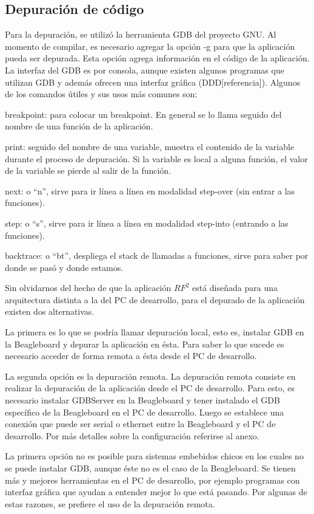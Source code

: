 \subsection{Depuración de código}
Para la depuración, se utilizó la herramienta GDB del proyecto GNU. 
Al momento de compilar, es necesario agregar la opción -g para que la aplicación pueda ser depurada. Esta opción agrega información en el código de la aplicación.
La interfaz del GDB es por consola, aunque existen algunos programas que utilizan GDB y además ofrecen una interfaz gráfica (DDD[referencia]).
Algunos de los comandos útiles y sus usos más comunes son: 

\bigskip
breakpoint: para colocar un breakpoint. En general se lo llama seguido del nombre de una función de la aplicación.

\bigskip
print: seguido del nombre de una variable, muestra el contenido de la variable durante el proceso de depuración. Si la variable es local a alguna función, el valor de la variable se pierde al salir de la función.

\bigskip
next: o “n”, sirve para ir línea a línea en modalidad step-over (sin entrar a las funciones).

\bigskip
step: o “s”, sirve para ir línea a línea en modalidad step-into (entrando a las funciones).

\bigskip
backtrace: o “bt”, despliega el stack de llamadas a funciones, sirve para saber por donde se pasó y donde estamos.

\bigskip
Sin olvidarnos del hecho de que la aplicación $RF^{2}$ está diseñada para una arquitectura distinta a la del PC de desarrollo, para el depurado de la aplicación existen dos alternativas. 

La primera es lo que se podría llamar depuración local, esto es, instalar GDB en la Beagleboard y depurar la aplicación en ésta. Para saber lo que sucede es necesario acceder de forma remota a ésta desde el PC de desarrollo. 

La segunda opción es la depuración remota. La depuración remota consiste en realizar la depuración de la aplicación desde el PC de desarrollo. Para esto, es necesario instalar GDBServer en la Beagleboard y tener instalado el GDB específico de la Beagleboard en el PC de desarrollo. Luego se establece una conexión que puede ser serial o ethernet entre la Beagleboard y el PC de desarrollo. Por más detalles sobre la configuración referirse al anexo.

\bigskip
La primera opción no es posible para sistemas embebidos chicos en los cuales no se puede instalar GDB, aunque éste no es el caso de la Beagleboard. 
Se tienen más y mejores herramientas en el PC de desarrollo, por ejemplo programas con interfaz gráfica que ayudan a entender mejor lo que está pasando. Por algunas de estas razones, se prefiere el uso de la depuración remota. 

